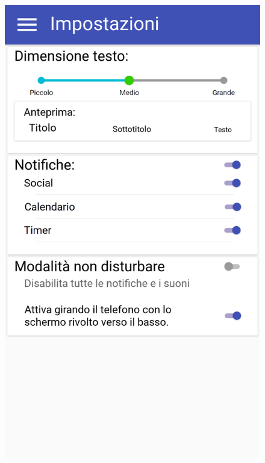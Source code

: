 \begin{figure}[H]
\begin{minipage}{.49\textwidth}
		\includegraphics[width=\textwidth]{img/wireframe/impostazioni_non_disturbare_non_attiva.png}
	\end{minipage}
\end{figure}
